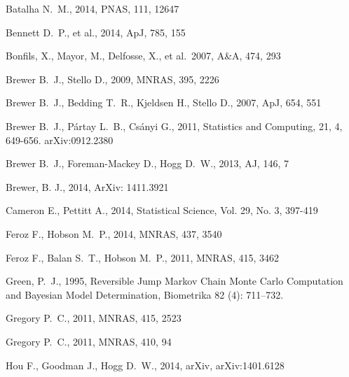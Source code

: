 \documentclass[useAMS,usenatbib]{mn2e}
\begin{document}
\begin{thebibliography}{99}
Batalha N.~M., 2014, PNAS, 111, 12647 

 Bennett D.~P., et al., 2014, ApJ, 785, 155 

 Bonfils, X., Mayor, M., Delfosse, X., et al.\ 2007, A\&A, 474, 293 

 Brewer B.~J., Stello D., 2009, MNRAS, 395, 2226 

Brewer B.~J., Bedding T.~R., Kjeldsen H., Stello D., 2007, ApJ, 654, 551 

 Brewer B.~J., P{\'a}rtay L.~B., Cs{\'a}nyi G., 2011,
Statistics and Computing, 21, 4, 649-656. arXiv:0912.2380

 Brewer B.~J., Foreman-Mackey D., Hogg D.~W., 2013, AJ, 146, 7

 Brewer, B. J., 2014,
ArXiv: 1411.3921

 Cameron E., Pettitt A., 2014,
Statistical Science, Vol. 29, No. 3, 397-419

 Feroz F., Hobson M.~P., 2014, MNRAS, 437, 3540 

 Feroz F., Balan S.~T., Hobson M.~P., 2011, MNRAS, 415, 3462

Green, P.~J., 1995, Reversible Jump Markov Chain Monte Carlo Computation and Bayesian Model Determination, Biometrika 82 (4): 711–732.

Gregory P.~C., 2011, MNRAS, 415, 2523 

Gregory P.~C., 2011, MNRAS, 410, 94 

 Hou F., Goodman J., Hogg D.~W., 2014, arXiv, arXiv:1401.6128 


\end{thebibliography}
\end{document}
